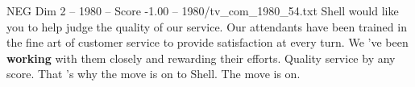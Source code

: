 \begin{textsample}{NEG Dim 2 – 1980 – Score -1.00 – 1980/tv\_com\_1980\_54.txt}  \label{ex:f2_neg_028}
Shell would like you to help judge the quality of our service.
Our attendants have been trained in the fine art of customer service to provide satisfaction at every turn.
We 've been \textbf{working} with them closely and rewarding their efforts.
Quality service by any score.
That 's why the move is on to Shell.
The move is on.

\end{textsample}
